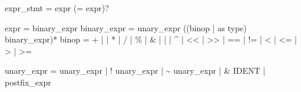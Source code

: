 \documentclass[
  11pt,
]{article}
\newenvironment{Shaded}{}{}
\newcommand{\NormalTok}[1]{#1}
\begin{document}
\begin{Shaded}
\begin{Highlighting}[]
\NormalTok{expr\_stmt      = expr (\textquotesingle{}=\textquotesingle{} expr)?}

\NormalTok{expr           = binary\_expr}
\NormalTok{binary\_expr    = unary\_expr ((binop | \textquotesingle{}as\textquotesingle{} type) binary\_expr)*}
\NormalTok{binop          = \textquotesingle{}+\textquotesingle{} | \textquotesingle{}{-}\textquotesingle{} | \textquotesingle{}*\textquotesingle{} | \textquotesingle{}/\textquotesingle{} | \textquotesingle{}\%\textquotesingle{} | \textquotesingle{}\&\textquotesingle{} | \textquotesingle{}|\textquotesingle{} | \textquotesingle{}\^{}\textquotesingle{}}
\NormalTok{               | \textquotesingle{}\textless{}\textless{}\textquotesingle{} | \textquotesingle{}\textgreater{}\textgreater{}\textquotesingle{} | \textquotesingle{}==\textquotesingle{} | \textquotesingle{}!=\textquotesingle{} | \textquotesingle{}\textless{}\textquotesingle{} | \textquotesingle{}\textless{}=\textquotesingle{} | \textquotesingle{}\textgreater{}\textquotesingle{} | \textquotesingle{}\textgreater{}=\textquotesingle{}}

\NormalTok{unary\_expr     = \textquotesingle{}{-}\textquotesingle{} unary\_expr | \textquotesingle{}!\textquotesingle{} unary\_expr | \textquotesingle{}\textasciitilde{}\textquotesingle{} unary\_expr}
\NormalTok{               | \textquotesingle{}\&\textquotesingle{} IDENT | postfix\_expr}


\end{Highlighting}
\end{Shaded}
\end{document}
